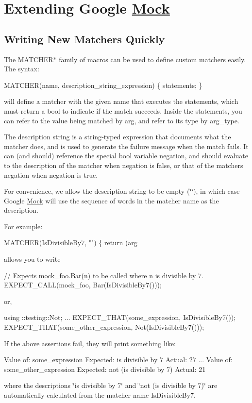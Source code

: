 \section*{Extending Google \hyperlink{classMock}{Mock}}

\subsection*{Writing New Matchers Quickly}

The {\ttfamily M\+A\+T\+C\+H\+E\+R$\ast$} family of macros can be used to define custom matchers easily. The syntax\+:


\begin{DoxyCode}
MATCHER(name, description\_string\_expression) \{ statements; \}
\end{DoxyCode}


will define a matcher with the given name that executes the statements, which must return a {\ttfamily bool} to indicate if the match succeeds. Inside the statements, you can refer to the value being matched by {\ttfamily arg}, and refer to its type by {\ttfamily arg\+\_\+type}.

The description string is a {\ttfamily string}-\/typed expression that documents what the matcher does, and is used to generate the failure message when the match fails. It can (and should) reference the special {\ttfamily bool} variable {\ttfamily negation}, and should evaluate to the description of the matcher when {\ttfamily negation} is {\ttfamily false}, or that of the matcher\textquotesingle{}s negation when {\ttfamily negation} is {\ttfamily true}.

For convenience, we allow the description string to be empty ({\ttfamily \char`\"{}\char`\"{}}), in which case Google \hyperlink{classMock}{Mock} will use the sequence of words in the matcher name as the description.

For example\+: 
\begin{DoxyCode}
MATCHER(IsDivisibleBy7, \textcolor{stringliteral}{""}) \{ \textcolor{keywordflow}{return} (arg %
\end{DoxyCode}
 allows you to write 
\begin{DoxyCode}
\textcolor{comment}{// Expects mock\_foo.Bar(n) to be called where n is divisible by 7.}
EXPECT\_CALL(mock\_foo, Bar(IsDivisibleBy7()));
\end{DoxyCode}
 or, 
\begin{DoxyCode}
using ::testing::Not;
...
  EXPECT\_THAT(some\_expression, IsDivisibleBy7());
  EXPECT\_THAT(some\_other\_expression, Not(IsDivisibleBy7()));
\end{DoxyCode}
 If the above assertions fail, they will print something like\+: 
\begin{DoxyCode}
  Value of: some\_expression
  Expected: is divisible by 7
    Actual: 27
...
  Value of: some\_other\_expression
  Expected: not (is divisible by 7)
    Actual: 21
\end{DoxyCode}
 where the descriptions {\ttfamily \char`\"{}is divisible by 7\char`\"{}} and {\ttfamily \char`\"{}not (is divisible
by 7)\char`\"{}} are automatically calculated from the matcher name {\ttfamily Is\+Divisible\+By7}.

